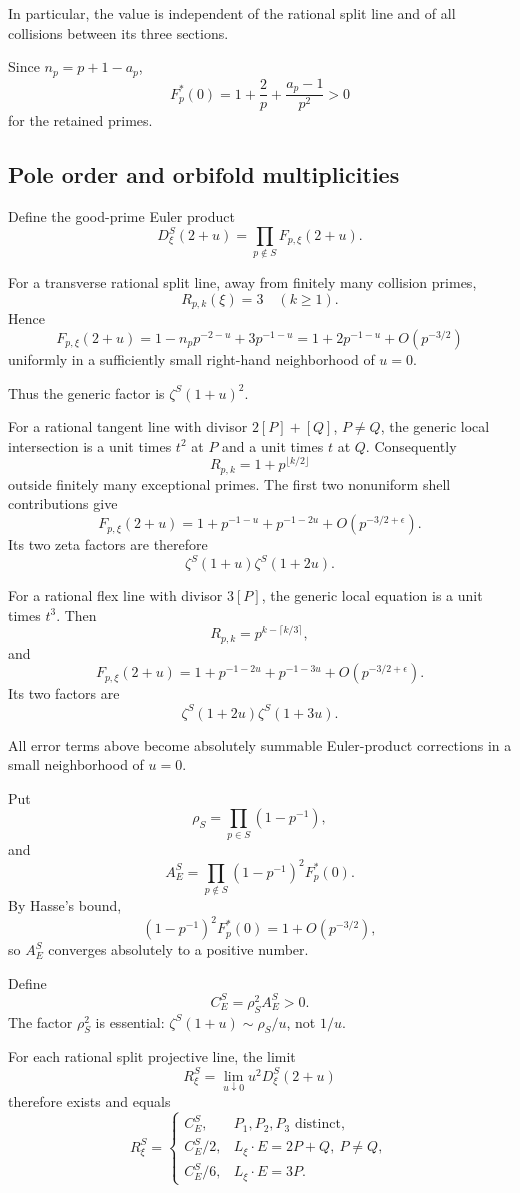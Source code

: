 \documentclass[11pt]{article}
\begin{document}
In particular, the value is independent
of the rational split line and of all
collisions between its three sections.

Since $n_p=p+1-a_p$,
\[
F_p^*(0)
=1+\frac2p+\frac{a_p-1}{p^2}>0
\]
for the retained primes.

\subsection{Pole order and orbifold multiplicities}

Define the good-prime Euler product
\[
D_\xi^S(2+u)
=\prod_{p\notin S}F_{p,\xi}(2+u).
\]

For a transverse rational split line,
away from finitely many collision primes,
\[
R_{p,k}(\xi)=3\quad(k\geq1).
\]
Hence
\[
F_{p,\xi}(2+u)
=
1-n_pp^{-2-u}+3p^{-1-u}
=
1+2p^{-1-u}+O(p^{-3/2})
\]
uniformly in a sufficiently small
right-hand neighborhood of $u=0$.

Thus the generic factor is
$\zeta^S(1+u)^2$.

For a rational tangent line with divisor
$2[P]+[Q]$, $P\ne Q$, the generic local
intersection is a unit times
$t^2$ at $P$ and a unit times $t$ at $Q$.
Consequently
\[
R_{p,k}=1+p^{\lfloor k/2\rfloor}
\]
outside finitely many exceptional primes.
The first two nonuniform shell contributions
give
\[
F_{p,\xi}(2+u)
=
1+p^{-1-u}+p^{-1-2u}
+O(p^{-3/2+\epsilon}).
\]
Its two zeta factors are therefore
\[
\zeta^S(1+u)\zeta^S(1+2u).
\]

For a rational flex line with divisor
$3[P]$, the generic local equation is
a unit times $t^3$. Then
\[
R_{p,k}=p^{k-\lceil k/3\rceil},
\]
and
\[
F_{p,\xi}(2+u)
=
1+p^{-1-2u}+p^{-1-3u}
+O(p^{-3/2+\epsilon}).
\]
Its two factors are
\[
\zeta^S(1+2u)\zeta^S(1+3u).
\]

All error terms above become absolutely
summable Euler-product corrections in a
small neighborhood of $u=0$.

Put
\[
\rho_S=\prod_{p\in S}(1-p^{-1}),
\]
and
\[
A_E^S=
\prod_{p\notin S}
(1-p^{-1})^2F_p^*(0).
\]
By Hasse's bound,
\[
(1-p^{-1})^2F_p^*(0)
=1+O(p^{-3/2}),
\]
so $A_E^S$ converges absolutely
to a positive number.

Define
\begin{equation}\label{eq:CE}
C_E^S=\rho_S^2A_E^S>0.
\end{equation}
The factor $\rho_S^2$ is essential:
$\zeta^S(1+u)\sim\rho_S/u$,
not $1/u$.

For each rational split projective line,
the limit
\[
R_\xi^S=
\lim_{u\downarrow0}u^2D_\xi^S(2+u)
\]
therefore exists and equals
\begin{equation}\label{eq:orbifold}
\boxed{
R_\xi^S=
\begin{cases}
C_E^S,&P_1,P_2,P_3\text{ distinct},\\[2mm]
C_E^S/2,&L_\xi\cdot E=2P+Q,\ P\ne Q,\\[2mm]
C_E^S/6,&L_\xi\cdot E=3P.
\end{cases}}
\end{equation}
\end{document}
